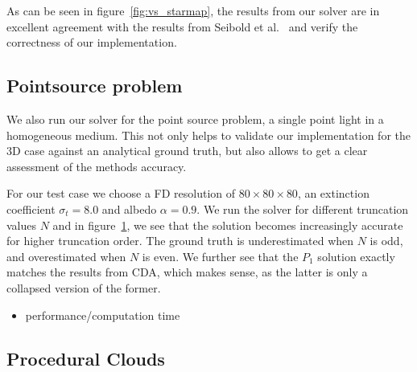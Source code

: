 As can be seen in figure~\ref{fig:vs_starmap}, the results from our solver are in excellent agreement with the results from Seibold et al.~\cite{Seibold14} and verify the correctness of our implementation.

\subsection{Pointsource problem}

We also run our solver for the point source problem, a single point light in a homogeneous medium. This not only helps to validate our implementation for the 3D case against an analytical ground truth, but also allows to get a clear assessment of the methods accuracy.

\begin{figure}[h]
\centering
\begin{subfigure}{0.45\columnwidth}
\end{subfigure}%
\hspace{0.05\columnwidth}
\begin{subfigure}{0.45\columnwidth}
\end{subfigure}%
\vspace{-0.2in}
\label{fig:pointsource}
\end{figure}

For our test case we choose a FD resolution of $80\times80\times80$, an extinction coefficient $\sigma_t=8.0$ and albedo $\alpha=0.9$. We run the solver for different truncation values $N$ and in figure~\ref{fig:pointsource}, we see that the solution becomes increasingly accurate for higher truncation order. The ground truth is underestimated when $N$ is odd, and overestimated when $N$ is even. We further see that the $P_1$ solution exactly matches the results from CDA, which makes sense, as the latter is only a collapsed version of the former.

\begin{itemize}
	\item performance/computation time
\end{itemize}

\subsection{Procedural Clouds}

